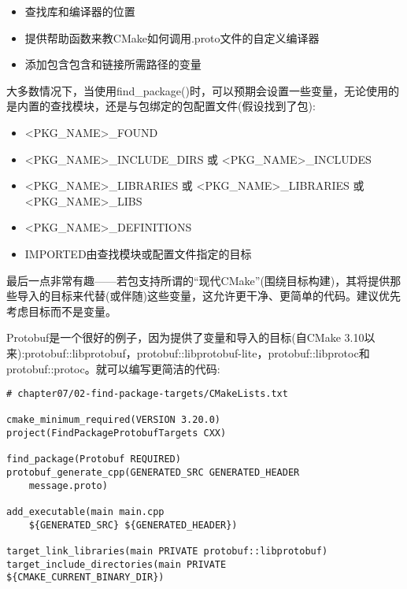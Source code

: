 \begin{itemize}
\item 
查找库和编译器的位置

\item 
提供帮助函数来教CMake如何调用.proto文件的自定义编译器

\item 
添加包含包含和链接所需路径的变量
\end{itemize}

大多数情况下，当使用find\_package()时，可以预期会设置一些变量，无论使用的是内置的查找模块，还是与包绑定的包配置文件(假设找到了包):

\begin{itemize}
\item 
<PKG\_NAME>\_FOUND

\item 
<PKG\_NAME>\_INCLUDE\_DIRS 或 <PKG\_NAME>\_INCLUDES

\item 
<PKG\_NAME>\_LIBRARIES 或 <PKG\_NAME>\_LIBRARIES 或 <PKG\_NAME>\_LIBS

\item 
<PKG\_NAME>\_DEFINITIONS

\item 
IMPORTED由查找模块或配置文件指定的目标
\end{itemize}

最后一点非常有趣——若包支持所谓的“现代CMake”(围绕目标构建)，其将提供那些导入的目标来代替(或伴随)这些变量，这允许更干净、更简单的代码。建议优先考虑目标而不是变量。

Protobuf是一个很好的例子，因为提供了变量和导入的目标(自CMake 3.10以来):protobuf::libprotobuf，protobuf::libprotobuf-lite，protobuf::libprotoc和protobuf::protoc。就可以编写更简洁的代码:

\begin{lstlisting}[style=styleCMake]
# chapter07/02-find-package-targets/CMakeLists.txt

cmake_minimum_required(VERSION 3.20.0)
project(FindPackageProtobufTargets CXX)

find_package(Protobuf REQUIRED)
protobuf_generate_cpp(GENERATED_SRC GENERATED_HEADER
	message.proto)

add_executable(main main.cpp
	${GENERATED_SRC} ${GENERATED_HEADER})
	
target_link_libraries(main PRIVATE protobuf::libprotobuf)
target_include_directories(main PRIVATE
${CMAKE_CURRENT_BINARY_DIR})
\end{lstlisting}

